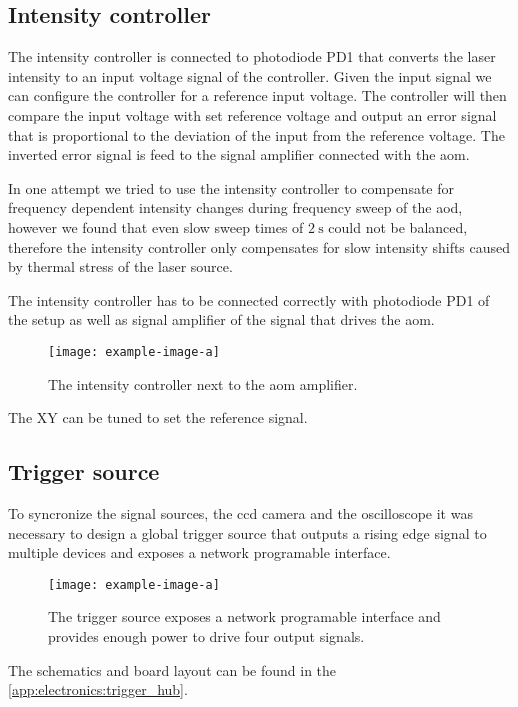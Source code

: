\subsection{Intensity controller}

The intensity controller is connected to photodiode PD1 that converts the
laser intensity to an input voltage signal of the controller. Given the
input signal we can configure the controller for a reference input voltage.
The controller will then compare the input voltage with set reference voltage
and output an error signal that is proportional to the deviation of the
input from the reference voltage. The inverted error signal is feed to the
signal amplifier connected with the \gls{aom}.

In one attempt we tried to use the intensity controller to compensate for
frequency dependent intensity changes during frequency sweep of the \gls{aod},
however we found that even slow sweep times of $\SI{2}{\second}$ could not
be balanced, therefore the intensity controller only compensates for slow
intensity shifts caused by thermal stress of the laser source.

The intensity controller has to be connected correctly with photodiode PD1
of the setup as well as signal amplifier of the signal that drives the
\gls{aom}.

\begin{figure}[h]
  \centering
  \texttt{[image: example-image-a]}
  \caption{The intensity controller next to the \gls{aom} amplifier.}
  \label{fig:intcontrol}
\end{figure}

The XY can be tuned to set the reference signal.

\subsection{Trigger source}

To syncronize the signal sources, the \gls{ccd} camera and the oscilloscope
it was necessary to design a global trigger source that outputs a rising edge
signal to multiple devices and exposes a network programable interface.

\begin{figure}[h]
  \centering
  \texttt{[image: example-image-a]}
  \caption{The trigger source exposes a network programable interface and
  provides enough power to drive four output signals.}
  \label{fig:elec:trig}
\end{figure}
The schematics and board layout can be found in the
\cref{app:electronics:trigger_hub}.

